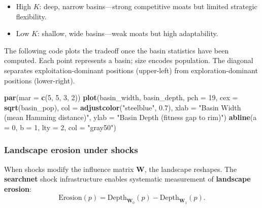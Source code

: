\documentclass[
]{article}
\newenvironment{Shaded}{\begin{snugshade}}{\end{snugshade}}
\newcommand{\AttributeTok}[1]{\textcolor[rgb]{0.13,0.29,0.53}{#1}}
\newcommand{\DecValTok}[1]{\textcolor[rgb]{0.00,0.00,0.81}{#1}}
\newcommand{\FloatTok}[1]{\textcolor[rgb]{0.00,0.00,0.81}{#1}}
\newcommand{\FunctionTok}[1]{\textcolor[rgb]{0.13,0.29,0.53}{\textbf{#1}}}
\newcommand{\NormalTok}[1]{#1}
\newcommand{\StringTok}[1]{\textcolor[rgb]{0.31,0.60,0.02}{#1}}
\begin{document}
\begin{itemize}
\item High $K$: deep, narrow basins---strong competitive moats but limited
  strategic flexibility.
\item Low $K$: shallow, wide basins---weak moats but high adaptability.
\end{itemize}

\noindent The following code plots the tradeoff once the basin
statistics have been computed. Each point represents a basin; size
encodes population. The diagonal separates exploitation-dominant
positions (upper-left) from exploration-dominant positions
(lower-right).

\begin{Shaded}
\begin{Highlighting}[]
\FunctionTok{par}\NormalTok{(}\AttributeTok{mar =} \FunctionTok{c}\NormalTok{(}\DecValTok{5}\NormalTok{, }\DecValTok{5}\NormalTok{, }\DecValTok{3}\NormalTok{, }\DecValTok{2}\NormalTok{))}
\FunctionTok{plot}\NormalTok{(basin\_width, basin\_depth,}
     \AttributeTok{pch =} \DecValTok{19}\NormalTok{, }\AttributeTok{cex =} \FunctionTok{sqrt}\NormalTok{(basin\_pop),}
     \AttributeTok{col =} \FunctionTok{adjustcolor}\NormalTok{(}\StringTok{"steelblue"}\NormalTok{, }\FloatTok{0.7}\NormalTok{),}
     \AttributeTok{xlab =} \StringTok{"Basin Width (mean Hamming distance)"}\NormalTok{,}
     \AttributeTok{ylab =} \StringTok{"Basin Depth (fitness gap to rim)"}\NormalTok{)}
\FunctionTok{abline}\NormalTok{(}\AttributeTok{a =} \DecValTok{0}\NormalTok{, }\AttributeTok{b =} \DecValTok{1}\NormalTok{, }\AttributeTok{lty =} \DecValTok{2}\NormalTok{, }\AttributeTok{col =} \StringTok{"gray50"}\NormalTok{)}
\end{Highlighting}
\end{Shaded}

\subsubsection{Landscape erosion under
shocks}\label{landscape-erosion-under-shocks}

When shocks modify the influence matrix \(\mathbf{W}\), the landscape
reshapes. The \textbf{searchnet} shock infrastructure enables systematic
measurement of \textbf{landscape erosion}:
\begin{equation}\label{eq:erosion}
  \text{Erosion}(p) = \text{Depth}_{\mathbf{W}_0}(p) - \text{Depth}_{\mathbf{W}_1}(p).
\end{equation}
\end{document}
